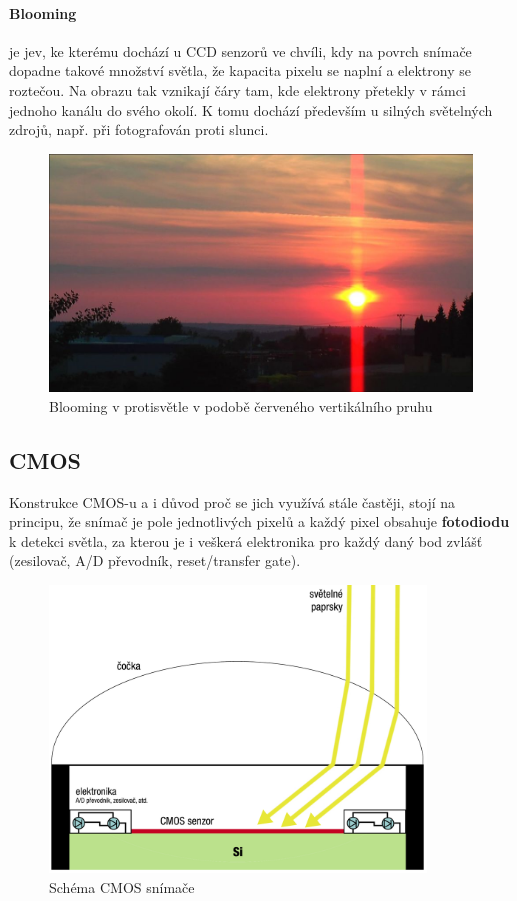 \documentclass[12pt,a4paper,titlepage,final]{report}
\begin{document}
\paragraph{Blooming}\label{subsubsec:blooming} je jev, ke kterému dochází u CCD senzorů ve chvíli, kdy na povrch snímače dopadne takové množství světla, že kapacita pixelu se naplní a elektrony se roztečou. Na obrazu tak vznikají čáry tam, kde elektrony přetekly v rámci jednoho kanálu do svého okolí. K tomu dochází především u silných světelných zdrojů, např. při fotografován proti slunci.

\begin{figure}[ht]
\begin{center}
\includegraphics[width=12cm]{images/blooming.jpg}
\caption{Blooming v protisvětle v podobě červeného vertikálního pruhu}
\label{fig:blooming}
\end{center}
\end{figure}

\subsection{CMOS}\label{subsec:cmos}

Konstrukce CMOS-u a i důvod proč se jich využívá stále častěji, stojí na principu, že snímač je pole jednotlivých pixelů a každý pixel obsahuje \textbf{fotodiodu} k detekci světla, za kterou je i veškerá elektronika pro každý daný bod zvlášť (zesilovač, A/D převodník, reset/transfer gate).

\begin{figure}[ht]
\begin{center}
\includegraphics[width=10cm]{images/cmos-schema.pdf}
\caption{Schéma CMOS snímače}
\label{fig:cmos-schema}
\end{center}
\end{figure}
\end{document}
